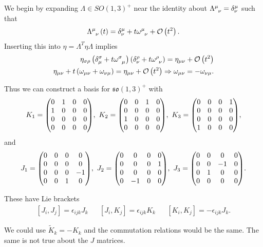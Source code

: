 We begin by expanding $\Lambda \in SO \left( 1,3 \right)^{+}$ near the identity about $\tensor{\Lambda}{^{\mu}_{\nu}} = \delta^{\mu}_\nu$ such that
\begin{align}
    \tensor{\Lambda}{^{\mu}_{\nu}}\left( t \right)  = \delta^{\mu}_\nu + t\tensor{\omega}{^{\mu}_\nu} + \mathcal{O}\left( t^2 \right) 
.\end{align}
Inserting this into $\eta = \Lambda^{T} \eta \Lambda$ implies
\begin{align}
    \eta_{\sigma \rho} \left( \delta^{\sigma}_{\mu} + t \tensor{\omega}{^{\sigma}_{\mu}} \right) \left( \delta^{\rho}_{\nu} + t \tensor{\omega}{^{\rho}_\nu} \right) = \eta_{\mu \nu} + \mathcal{O}\left( t^2 \right) \\
    \eta_{\mu \nu} + t \left( \omega_{\mu \nu} + \omega_{\nu \mu} \right) = \eta_{\mu \nu} + \mathcal{O}\left( t^2 \right) 
    \implies \omega_{\mu \nu} = - \omega_{\nu \mu}
.\end{align}

Thus we can construct a basis for $\mathfrak{so}\left( 1,3 \right)^{+}$ with
\begin{align}
    K_1 = \mqty( 0&1&0&0\\1&0&0&0\\0&0&0&0 \\0&0&0&0 ),~ K_2 = \mqty( 0 & 0 & 1 &0 \\ 0&0&0&0\\ 1 & 0 & 0 & 0\\0&0&0&0 ),~ K_3 = \mqty( 0&0&0& 1 \\0&0&0&0 \\0&0&0&0 \\ 1 & 0 & 0 & 0)
,\end{align}
and
\begin{align}
    J_1 = \mqty(0&0&0&0 \\0&0&0&0\\ 0&0&0&-1\\ 0&0&1&0),~ J_2 = \mqty( 0 & 0 & 0 & 0 \\ 0&0&0& 1 \\ 0&0&0&0\\ 0 & -1 & 0 & 0),~ J_3 = \mqty(0&0&0&0 \\ 0&0&-1&0\\ 0&1&0&0\\ 0&0&0&0)
.\end{align}

These have Lie brackets
\begin{align}
    \left[ J_{i}, J_{j} \right] = \epsilon_{ijk} J_{k} && \left[ J_{i}, K_{j} \right] = \epsilon_{ijk} K_k && \left[ K_{i}, K_{j} \right] = -\epsilon_{ijk} J_k
.\end{align}

\begin{note}
    We could use $\widetilde{K}_k = - K_k$ and the commutation relations would be the same. The same is not true about the $J$ matrices.
\end{note}
